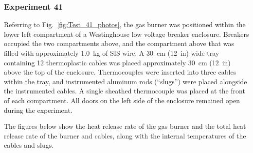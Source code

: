 \subsubsection{Experiment 41}

Referring to Fig.~\ref{fig:Test_41_photos}, the gas burner was positioned within the lower left compartment of a Westinghouse low voltage breaker enclosure. Breakers occupied the two compartments above, and the compartment above that was filled with approximately 1.0~kg of SIS wire. A 30~cm (12~in) wide tray containing 12 thermoplastic cables was placed approximately 30~cm (12~in) above the top of the enclosure. Thermocouples were inserted into three cables within the tray, and instrumented aluminum rods (``slugs'') were placed alongside the instrumented cables. A single sheathed thermocouple was placed at the front of each compartment. All doors on the left side of the enclosure remained open during the experiment.

The figures below show the heat release rate of the gas burner and the total heat release rate of the burner and cables, along with the internal temperatures of the cables and slugs.

